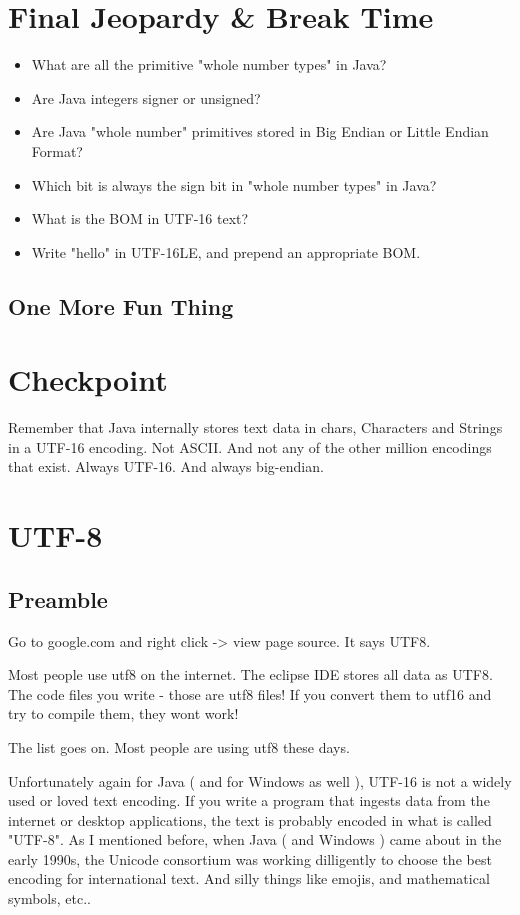 \documentclass[12pt]{article}
\begin{document}
\section{Final Jeopardy \& Break Time}
\begin{itemize}
\item What are all the primitive "whole number types" in Java?
\item Are Java integers signer or unsigned?
\item Are Java "whole number" primitives stored in Big Endian or Little Endian Format?
\item Which bit is always the sign bit in "whole number types" in Java?\item What is the BOM in UTF-16 text?
\item Write "hello" in UTF-16LE, and prepend an appropriate BOM.
\end{itemize}

\subsection{One More Fun Thing}



\section{ Checkpoint }
Remember that Java internally stores text data in chars, Characters and Strings in a UTF-16 encoding. Not ASCII. And not any of the other million encodings that exist. Always UTF-16. And always big-endian.

\section{UTF-8}
\subsection{Preamble}

Go to google.com and right click -> view page source. It says UTF8.

Most people use utf8 on the internet. The eclipse IDE stores all data as UTF8.
The code files you write - those are utf8 files! If you convert them to utf16
and try to compile them, they wont work!

The list goes on. Most people are using utf8 these days.

Unfortunately again for Java ( and for Windows as well ), UTF-16 is not a widely used or loved text encoding. If you write a program that ingests data from the internet or desktop applications, the text is probably encoded in what is called "UTF-8". As I  mentioned before, when Java ( and Windows ) came about in the early 1990s, the Unicode consortium was working dilligently to choose the best encoding for international text. And silly things like emojis, and mathematical symbols, etc..
\end{document}
